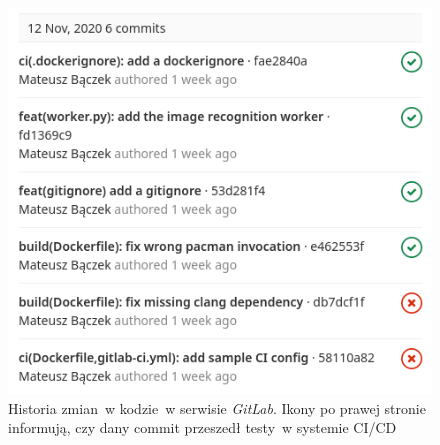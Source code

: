 \begin{figure}[H]
    \centering
    \caption{ Historia zmian~w kodzie~w serwisie \textit{GitLab}.
    Ikony po prawej stronie informują, czy dany commit przeszedł testy~w systemie CI/CD }
\includegraphics[width=.7\linewidth]{rys04/gitlab_ci_commit_status.png}
    
	\label{gitlab_ci_history}
\end{figure}




